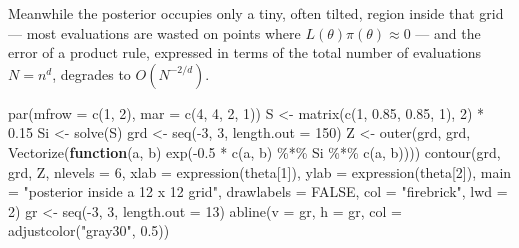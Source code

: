 \documentclass[
  letterpaper,
  DIV=11,
  numbers=noendperiod]{scrreprt}
\newenvironment{Shaded}{\begin{snugshade}}{\end{snugshade}}
\newcommand{\AttributeTok}[1]{\textcolor[rgb]{0.40,0.45,0.13}{#1}}
\newcommand{\ConstantTok}[1]{\textcolor[rgb]{0.56,0.35,0.01}{#1}}
\newcommand{\ControlFlowTok}[1]{\textcolor[rgb]{0.00,0.23,0.31}{\textbf{#1}}}
\newcommand{\DecValTok}[1]{\textcolor[rgb]{0.68,0.00,0.00}{#1}}
\newcommand{\FloatTok}[1]{\textcolor[rgb]{0.68,0.00,0.00}{#1}}
\newcommand{\FunctionTok}[1]{\textcolor[rgb]{0.28,0.35,0.67}{#1}}
\newcommand{\NormalTok}[1]{\textcolor[rgb]{0.00,0.23,0.31}{#1}}
\newcommand{\OtherTok}[1]{\textcolor[rgb]{0.00,0.23,0.31}{#1}}
\newcommand{\SpecialCharTok}[1]{\textcolor[rgb]{0.37,0.37,0.37}{#1}}
\newcommand{\StringTok}[1]{\textcolor[rgb]{0.13,0.47,0.30}{#1}}
\begin{document}
Meanwhile the posterior occupies only a tiny, often tilted, region
inside that grid --- most evaluations are wasted on points where
\(L(\theta)\pi(\theta)
\approx 0\) --- and the error of a product rule, expressed in terms of
the total number of evaluations \(N=n^d\), degrades to \(O(N^{-2/d})\).

\begin{Shaded}
\begin{Highlighting}[]
\FunctionTok{par}\NormalTok{(}\AttributeTok{mfrow =} \FunctionTok{c}\NormalTok{(}\DecValTok{1}\NormalTok{, }\DecValTok{2}\NormalTok{), }\AttributeTok{mar =} \FunctionTok{c}\NormalTok{(}\DecValTok{4}\NormalTok{, }\DecValTok{4}\NormalTok{, }\DecValTok{2}\NormalTok{, }\DecValTok{1}\NormalTok{))}
\NormalTok{S }\OtherTok{\textless{}{-}} \FunctionTok{matrix}\NormalTok{(}\FunctionTok{c}\NormalTok{(}\DecValTok{1}\NormalTok{, }\FloatTok{0.85}\NormalTok{, }\FloatTok{0.85}\NormalTok{, }\DecValTok{1}\NormalTok{), }\DecValTok{2}\NormalTok{) }\SpecialCharTok{*} \FloatTok{0.15}
\NormalTok{Si }\OtherTok{\textless{}{-}} \FunctionTok{solve}\NormalTok{(S)}
\NormalTok{grd }\OtherTok{\textless{}{-}} \FunctionTok{seq}\NormalTok{(}\SpecialCharTok{{-}}\DecValTok{3}\NormalTok{, }\DecValTok{3}\NormalTok{, }\AttributeTok{length.out =} \DecValTok{150}\NormalTok{)}
\NormalTok{Z }\OtherTok{\textless{}{-}} \FunctionTok{outer}\NormalTok{(grd, grd, }\FunctionTok{Vectorize}\NormalTok{(}\ControlFlowTok{function}\NormalTok{(a, b) }\FunctionTok{exp}\NormalTok{(}\SpecialCharTok{{-}}\FloatTok{0.5} \SpecialCharTok{*} \FunctionTok{c}\NormalTok{(a, b) }\SpecialCharTok{\%*\%}\NormalTok{ Si }\SpecialCharTok{\%*\%} \FunctionTok{c}\NormalTok{(a, b))))}
\FunctionTok{contour}\NormalTok{(grd, grd, Z, }\AttributeTok{nlevels =} \DecValTok{6}\NormalTok{, }\AttributeTok{xlab =} \FunctionTok{expression}\NormalTok{(theta[}\DecValTok{1}\NormalTok{]), }\AttributeTok{ylab =} \FunctionTok{expression}\NormalTok{(theta[}\DecValTok{2}\NormalTok{]),}
        \AttributeTok{main =} \StringTok{"posterior inside a 12 x 12 grid"}\NormalTok{, }\AttributeTok{drawlabels =} \ConstantTok{FALSE}\NormalTok{, }\AttributeTok{col =} \StringTok{"firebrick"}\NormalTok{, }\AttributeTok{lwd =} \DecValTok{2}\NormalTok{)}
\NormalTok{gr }\OtherTok{\textless{}{-}} \FunctionTok{seq}\NormalTok{(}\SpecialCharTok{{-}}\DecValTok{3}\NormalTok{, }\DecValTok{3}\NormalTok{, }\AttributeTok{length.out =} \DecValTok{13}\NormalTok{)}
\FunctionTok{abline}\NormalTok{(}\AttributeTok{v =}\NormalTok{ gr, }\AttributeTok{h =}\NormalTok{ gr, }\AttributeTok{col =} \FunctionTok{adjustcolor}\NormalTok{(}\StringTok{"gray30"}\NormalTok{, }\FloatTok{0.5}\NormalTok{))}

\end{Highlighting}
\end{Shaded}
\end{document}
